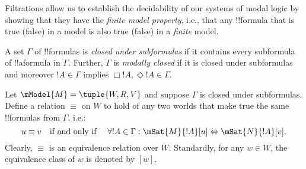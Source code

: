 \documentclass[../../../include/open-logic-section]{subfiles}
\begin{document}


Filtrations allow us to establish the decidability of our systems of
modal logic by showing that they have the \emph{finite model
  property}, i.e., that any !!{formula} that is true (false) in a
model is also true (false) in a \emph{finite} model.

\begin{defn}
  A set $\Gamma$ of !!{formula}s is \emph{closed under subformulas} if it
  contains every subformula of !!a{formula} in $\Gamma$. Further,
  $\Gamma$ is \emph{modally closed} if it is closed under subformulas
  and moreover $!A \in \Gamma$ implies $\Box!A,
  \Diamond!A \in \Gamma$. 
\end{defn}

\begin{defn}
Let $\mModel{M} =\tuple{W, R, V}$ and suppose $\Gamma$ is closed under
subformulas. Define a relation $\equiv$ on $W$ to hold of any two
worlds that make true the same !!{formula}s from $\Gamma$, i.e.:
\[
u \equiv v \quad \text{if and only if }\quad \forall !A \in \Gamma : \mSat{M}{!A}[u] \Leftrightarrow \mSat{N}{!A}[v].
\]
Clearly, $\equiv$ is an equivalence relation over $W$. Standardly, for
any $w \in W$, the equivalence class of $w$ is denoted by $[w]$.
\end{defn}
\end{document}
